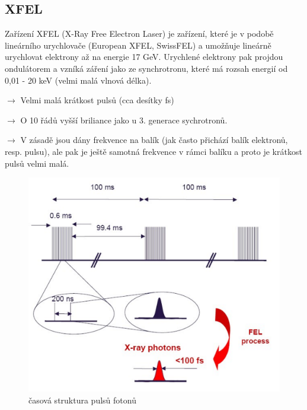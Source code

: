 \subsection{XFEL} 

Zařízení XFEL (X-Ray Free Electron Laser) je zařízení, které je v podobě lineárního urychlovače (European XFEL, SwissFEL) a umožňuje lineárně urychlovat elektrony až na energie 17 GeV. Urychlené elektrony pak projdou ondulátorem a vzníká záření jako ze synchrotronu, které má rozsah energií od 0,01 - 20 keV (velmi malá vlnová délka).

$\rightarrow$ Velmi malá krátkost pulsů (cca desítky fs)

$\rightarrow$ O 10 řádů vyšší briliance jako u 3. generace sychrotronů. 

$\rightarrow$ V zásadě jsou dány frekvence na balík (jak často přichází balík elektronů, resp. pulsu), ale pak je ještě samotná frekvence v rámci balíku a proto je krátkost pulsů velmi malá.

\begin{figure}[H]
    \centering
    \includegraphics[width=0.5\linewidth]{img/časová struktura pulsů fotonů.png}
    \caption{časová struktura pulsů fotonů}
\end{figure}

\newpage
\mbox{}
\newpage
